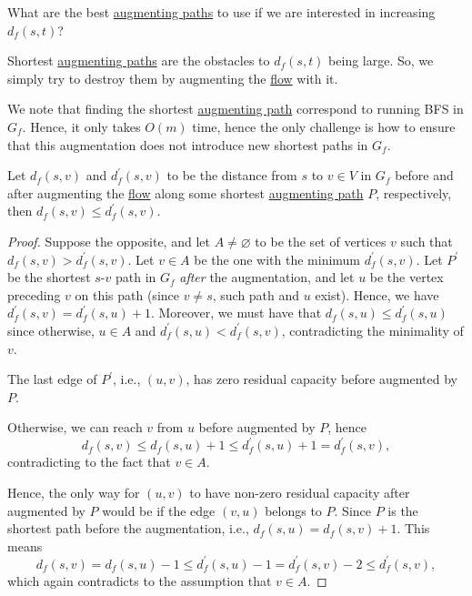 \begin{problem*}
	What are the best \hyperref[def:augmenting-path]{augmenting paths} to use if we are interested in increasing \(d_f(s, t)\)?
\end{problem*}
\begin{answer}
	Shortest \hyperref[def:augmenting-path]{augmenting paths} are the obstacles to \(d_f(s, t)\) being large. So, we simply try to destroy them by augmenting the \hyperref[def:flow]{flow} with it.
\end{answer}

We note that finding the shortest \hyperref[def:augmenting-path]{augmenting path} correspond to running BFS in \(G_f\). Hence, it only takes \(O(m)\) time, hence the only challenge is how to ensure that this augmentation does not introduce new shortest paths in \(G_f\).

\begin{lemma}\label{lma:shortest-augmenting-path-non-decreasing}
	Let \(d_f(s, v)\) and \(d_f^{\prime} (s, v)\) to be the distance from \(s\) to \(v \in V\) in \(G_f\) before and after augmenting the \hyperref[def:flow]{flow} along some shortest \hyperref[def:augmenting-path]{augmenting path} \(P\), respectively, then \(d_f(s, v) \leq d_f^{\prime} (s, v)\).
\end{lemma}
\begin{proof}
	Suppose the opposite, and let \(A \neq \varnothing \) to be the set of vertices \(v\) such that \(d_f(s, v) > d_f^{\prime} (s, v)\). Let \(v\in A\) be the one with the minimum \(d_f^{\prime} (s, v)\). Let \(P^{\prime} \) be the shortest \(s\)-\(v\) path in \(G_f\) \emph{after} the augmentation, and let \(u\) be the vertex preceding \(v\) on this path (since \(v \neq s\), such path and \(u\) exist). Hence, we have \(d_f^{\prime} (s, v) = d_f^{\prime} (s, u) + 1\). Moreover, we must have that \(d_f(s, u) \leq d_f^{\prime} (s, u)\) since otherwise, \(u \in A\) and \(d_f^{\prime} (s, u) < d_f^{\prime} (s, v)\), contradicting the minimality of \(v\).

	\begin{claim}
		The last edge of \(P^{\prime} \), i.e., \((u, v)\), has zero residual capacity before augmented by \(P\).
	\end{claim}
	\begin{explanation}
		Otherwise, we can reach \(v\) from \(u\) before augmented by \(P\), hence
		\[
			d_f(s, v)
			\leq d_f(s, u) + 1
			\leq d_f^{\prime} (s, u) + 1
			= d_f^{\prime} (s, v),
		\]
		contradicting to the fact that \(v \in A\).
	\end{explanation}

	Hence, the only way for \((u, v)\) to have non-zero residual capacity after augmented by \(P\) would be if the edge \((v, u)\) belongs to \(P\). Since \(P\) is the shortest path before the augmentation, i.e., \(d_f(s, u) = d_f(s, v) + 1\). This means
	\[
		d_f(s, v)
		= d_f(s, u) - 1
		\leq d_f^{\prime} (s, u) - 1
		= d_f^{\prime} (s, v) - 2
		\leq d_f^{\prime} (s, v),
	\]
	which again contradicts to the assumption that \(v \in A\).
\end{proof}

